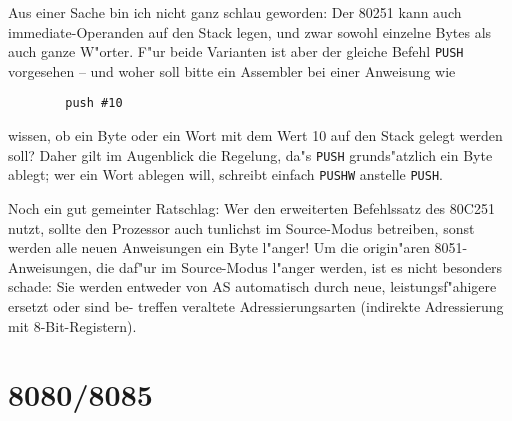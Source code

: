 \documentclass[12pt,a4paper,twoside]{report}
\newcommand{\tty}[1]{{\tt #1}}
\begin{document}
Aus einer Sache bin ich nicht ganz schlau geworden: Der 80251 kann
auch immediate-Operanden auf den Stack legen, und zwar sowohl einzelne
Bytes als auch ganze W"orter.  F"ur beide Varianten ist aber der gleiche
Befehl \tty{PUSH} vorgesehen -- und woher soll bitte ein Assembler bei
einer Anweisung wie
\begin{verbatim}
        push #10
\end{verbatim}
wissen, ob ein Byte oder ein Wort mit dem Wert 10 auf den Stack gelegt
werden soll?  Daher gilt im Augenblick die Regelung, da"s \tty{PUSH}
grunds"atzlich ein Byte ablegt; wer ein Wort ablegen will, schreibt
einfach \tty{PUSHW} anstelle \tty{PUSH}.
\par
Noch ein gut gemeinter Ratschlag: Wer den erweiterten Befehlssatz des
80C251 nutzt, sollte den Prozessor auch tunlichst im Source-Modus
betreiben, sonst werden alle neuen Anweisungen ein Byte l"anger!  Um
die origin"aren 8051-Anweisungen, die daf"ur im Source-Modus l"anger
werden, ist es nicht besonders schade: Sie werden entweder von AS
automatisch durch neue, leistungsf"ahigere ersetzt oder sind be-
treffen veraltete Adressierungsarten (indirekte Adressierung mit
8-Bit-Registern).


\section{8080/8085}
\label{8080Spec}
\end{document}
